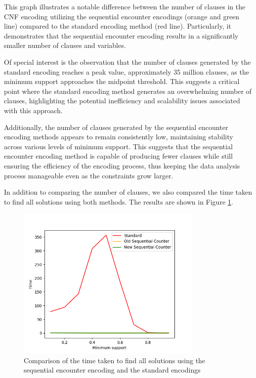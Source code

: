 This graph illustrates a notable difference between the number of clauses in the CNF encoding
utilizing the sequential encounter encodings (orange and green line) compared to the standard encoding method (red line).
Particularly, it demonstrates that the sequential encounter encoding results in a significantly smaller number of clauses and variables.

Of special interest is the observation that the number of clauses generated by the standard encoding reaches a peak value,
approximately 35 million clauses, as the minimum support approaches the midpoint threshold.
This suggests a critical point where the standard encoding method generates an overwhelming number of clauses,
highlighting the potential inefficiency and scalability issues associated with this approach.

Additionally, the number of clauses generated by the sequential encounter encoding methods appears to remain consistently low,
maintaining stability across various levels of minimum support.
This suggests that the sequential encounter encoding method is capable of producing fewer clauses while still ensuring the efficiency of the encoding process,
thus keeping the data analysis process manageable even as the constraints grow larger.

In addition to comparing the number of clauses, we also compared the time taken to find all solutions using both methods.
The results are shown in Figure \ref{fig:4_2}.
\begin{figure}[H]
    \centering
    \includegraphics[width=0.8\textwidth]{chapter4/image/n_trans_28_time.png}
    \caption{Comparison of the time taken to find all solutions using the sequential encounter encoding and the standard encodings}
    \label{fig:4_2}
\end{figure}

